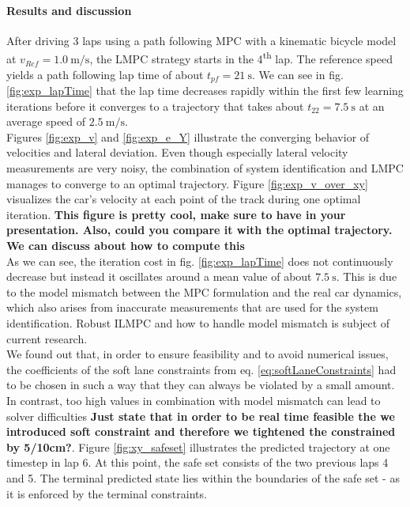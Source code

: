 \paragraph{Results and discussion}
After driving 3 laps using a path following MPC with a kinematic bicycle model at $v_{Ref}=\SI{1.0}{\meter\per\second}$, the LMPC strategy starts in the 4\textsuperscript{th} lap. The reference speed yields a path following lap time of about $t_{pf}=\SI{21}{\second}$. We can see in fig. \ref{fig:exp_lapTime} that the lap time decreases rapidly within the first few learning iterations before it converges to a trajectory that takes about $t_{22}=\SI{7.5}{\second}$ at an average speed of $\SI{2.5}{\meter\per\second}$.\\
Figures \ref{fig:exp_v} and \ref{fig:exp_e_Y} illustrate the converging behavior of velocities and lateral deviation. Even though especially lateral velocity measurements are very noisy, the combination of system identification and LMPC manages to converge to an optimal trajectory.
Figure \ref{fig:exp_v_over_xy} visualizes the car's velocity at each point of the track during one optimal iteration. {\bfseries{This figure is pretty cool, make sure to have in your presentation. Also, could you compare it with the optimal trajectory. We can discuss about how to compute this}} \\
As we can see, the iteration cost in fig. \ref{fig:exp_lapTime} does not continuously decrease but instead it oscillates around a mean value of about $\SI{7.5}{\second}$. This is due to the model mismatch between the MPC formulation and the real car dynamics, which also arises from inaccurate measurements that are used for the system identification. Robust ILMPC and how to handle model mismatch is subject of current research.\\
We found out that, in order to ensure feasibility and to avoid numerical issues, the coefficients of the soft lane constraints from eq. \eqref{eq:softLaneConstraints} had to be chosen in such a way that they can always be violated by a small amount. In contrast, too high values in combination with model mismatch can lead to solver difficulties {\bfseries{Just state that in order to be real time feasible the we introduced soft constraint and therefore we tightened the constrained by 5/10cm?}}.
Figure \ref{fig:xy_safeset} illustrates the predicted trajectory at one timestep in lap 6. At this point, the safe set consists of the two previous laps 4 and 5. The terminal predicted state lies within the boundaries of the safe set - as it is enforced by the terminal constraints.

